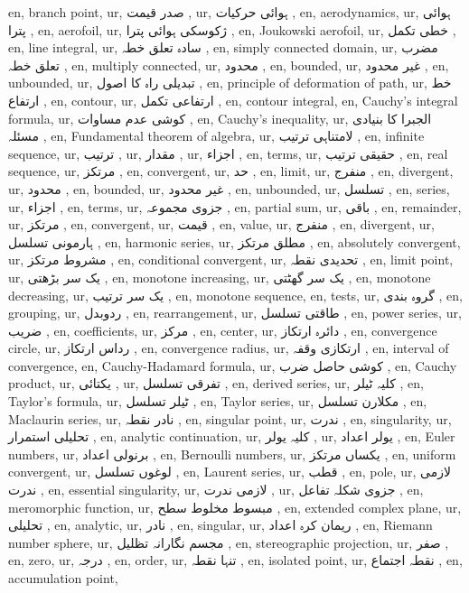 en, branch point,
ur, صدر قیمت ,
ur, ہوائی حرکیات ,
en, aerodynamics,
ur, ہوائی پترا ,
en, aerofoil,
ur, ژکوسکی ہوائی پترا ,
en, Joukowski aerofoil,
ur, خطی تکمل ,
en, line integral,
ur, سادہ تعلق خطہ ,
en, simply connected domain,
ur, مضرب تعلق خطہ ,
en, multiply connected,
ur, محدود ,
en, bounded,
ur, غیر محدود ,
en, unbounded,
ur, تبدیلی راہ کا اصول ,
en, principle of deformation of path,
ur, خط ارتفاع ,
en, contour,
ur, ارتفاعی تکمل ,
en, contour integral,
en, Cauchy's integral formula,
ur, کوشی عدم مساوات ,
en, Cauchy's inequality,
ur, الجبرا کا بنیادی مسئلہ ,
en, Fundamental theorem of algebra,
ur, لامتناہی ترتیب ,
en, infinite sequence,
ur, ترتیب ,
ur, مقدار ,
ur, اجزاء ,
en, terms,
ur, حقیقی ترتیب ,
en, real sequence,
ur, مرتکز ,
en, convergent,
ur, حد ,
en, limit,
ur, منفرج ,
en, divergent,
ur, محدود ,
en, bounded,
ur, غیر محدود ,
en, unbounded,
ur, تسلسل ,
en, series,
ur, اجزاء ,
en, terms,
ur, جزوی مجموعہ ,
en, partial sum,
ur, باقی ,
en, remainder,
ur, مرتکز ,
en, convergent,
ur, قیمت ,
en, value,
ur, منفرج ,
en, divergent,
ur, ہارمونی تسلسل ,
en, harmonic series,
ur, مطلق مرتکز ,
en, absolutely convergent,
ur, مشروط مرتکز ,
en, conditional convergent,
ur, تحدیدی نقطہ ,
en, limit point,
ur, یک سر بڑھتی ,
en, monotone increasing,
ur, یک سر گھٹتی ,
en, monotone decreasing,
ur, یک سر ترتیب ,
en, monotone sequence,
en, tests,
ur, گروہ بندی ,
en, grouping,
ur, ردوبدل ,
en, rearrangement,
ur, طاقتی تسلسل ,
en, power series,
ur, ضریب ,
en, coefficients,
ur, مرکز ,
en, center,
ur, دائرہ ارتکاز ,
en, convergence circle,
ur, رداس ارتکاز ,
en, convergence radius,
ur, ارتکازی وقفہ ,
en, interval of convergence,
en, Cauchy-Hadamard formula,
ur, کوشی حاصل ضرب ,
en, Cauchy product,
ur, یکتائی ,
ur, تفرقی تسلسل ,
en, derived series,
ur, کلیہ ٹیلر ,
en, Taylor's formula,
ur, ٹیلر تسلسل ,
en, Taylor series,
ur, مکلارن تسلسل ,
en, Maclaurin series,
ur, نادر نقطہ ,
en, singular point,
ur, ندرت ,
en, singularity,
ur, تحلیلی استمرار ,
en, analytic continuation,
ur, کلیہ یولر ,
ur, یولر اعداد ,
en, Euler numbers,
ur, برنولی اعداد ,
en, Bernoulli numbers,
ur, یکساں مرتکز ,
en, uniform convergent,
ur, لوغوں تسلسل ,
en, Laurent series,
ur, قطب ,
en, pole,
ur, لازمی ندرت ,
en, essential singularity,
ur, لازمی ندرت ,
ur, جزوی شکلہ تفاعل ,
en, meromorphic function,
ur, مبسوط مخلوط سطح ,
en, extended complex plane,
ur, تحلیلی ,
en, analytic,
ur, نادر ,
en, singular,
ur, ریمان کرہ اعداد ,
en, Riemann number sphere,
ur, مجسم نگارانہ تظلیل ,
en, stereographic projection,
ur, صفر ,
en, zero,
ur, درجہ ,
en, order,
ur, تنہا نقطہ ,
en, isolated point,
ur, نقطہ اجتماع ,
en, accumulation point,
